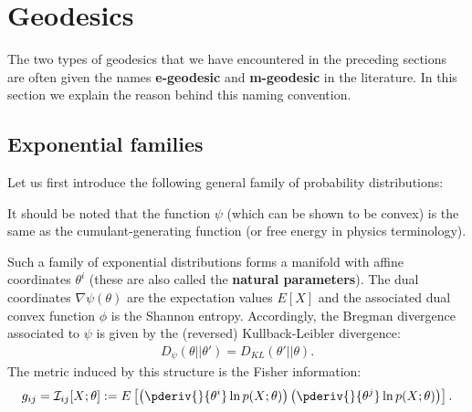 \section{Geodesics}

    The two types of geodesics that we have encountered in the preceding sections are often given the names \textbf{e-geodesic} and \textbf{m-geodesic} in the literature. In this section we explain the reason behind this naming convention.

\subsection{Exponential families}

    Let us first introduce the following general family of probability distributions:
    \begin{remark}
        It should be noted that the function $\psi$ (which can be shown to be convex) is the same as the cumulant-generating function (or free energy in physics terminology).
    \end{remark}

    Such a family of exponential distributions forms a manifold with affine coordinates $\theta^i$ (these are also called the \textbf{natural parameters}). The dual coordinates $\nabla\psi(\theta)$ are the expectation values $E[X]$ and the associated dual convex function $\phi$ is the Shannon entropy. Accordingly, the Bregman divergence associated to $\psi$ is given by the (reversed) Kullback-Leibler divergence:
    \begin{gather}
        \label{info:KL_reversal}
        D_\psi(\theta||\theta') = D_{KL}(\theta'||\theta).
    \end{gather}
    The metric induced by this structure is the Fisher information:
    \begin{gather}
        g_{ij} = \mathcal{I}_{ij}[X;\theta] := E\left[\left(\pderiv{}{\theta^i}\ln p(X;\theta)\right)\left(\pderiv{}{\theta^j}\ln p(X;\theta)\right)\right].
    \end{gather}

